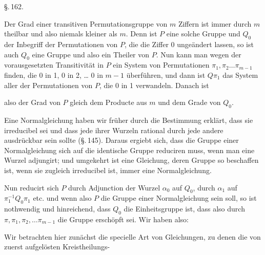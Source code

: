 
\begin{center}
\S.\,162.

\end{center}

Der Grad einer transitiven Permutationsgruppe von $m$ Ziffern
ist immer durch $m$ theilbar und also niemals kleiner als $m$.
Denn ist $P$ eine solche Gruppe und $Q_0$ der Inbegriff der Permutationen
von $P$, die die Ziffer 0 ungeändert lassen, so ist auch
$Q_0$ eine Gruppe und also ein Theiler von $P$. Nun kann man
wegen der vorausgesetzten Transitivität in $P$ ein System von
Permutationen $\pi_1, \pi_2 \ldots \pi_{m-1}$ finden, die 0 in 1, 0 in 2, \ldots
0 in $m-1$ überführen, und dann ist $Q\pi_1$ das System aller der
Permutationen von $P$, die 0 in 1 verwandeln. Danach ist


also der Grad von $P$ gleich dem Producte aus $m$ und dem Grade
von $Q_0$.


Eine Normalgleichung haben wir früher durch die Bestimmung
erklärt, dass sie irreducibel sei und dass jede ihrer
Wurzeln rational durch jede andere ausdrückbar sein sollte
(\S.\,145). Daraus ergiebt sich, dass die Gruppe einer Normalgleichung
sich auf die identische Gruppe reduciren muss, wenn
man eine Wurzel adjungirt; und umgekehrt ist eine Gleichung,
deren Gruppe so beschaffen ist, wenn sie zugleich irreducibel
ist, immer eine Normalgleichung.

Nun reducirt sich $P$ durch Adjunction der Wurzel $\alpha_0$ auf
$Q_0$, durch $\alpha_1$ auf $\pi_1^{-1}Q_0\pi_1$ etc. und wenn also $P$ die Gruppe
einer Normalgleichung sein soll, so ist nothwendig und hinreichend,
dass $Q_0$ die Einheitsgruppe ist, dass also durch
$\pi, \pi_1, \pi_2, \ldots \pi_{m-1}$ die Gruppe erschöpft sei. Wir haben also:


Wir betrachten hier zunächst die specielle Art von Gleichungen,
zu denen die von  zuerst aufgelösten Kreistheilungs-
